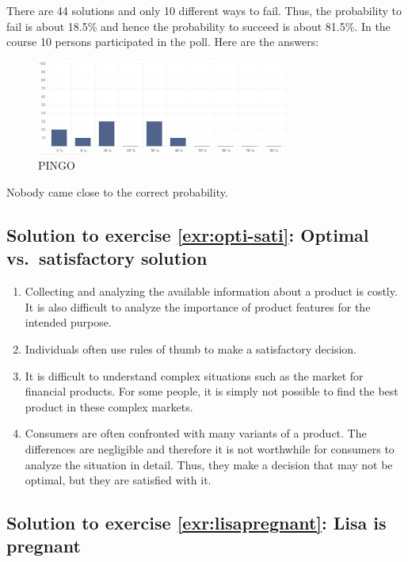 \documentclass[
  12pt,
  oneside]{book}
\providecommand{\tightlist}{%
  \setlength{\itemsep}{0pt}\setlength{\parskip}{0pt}}
\theoremstyle{definition}
\theoremstyle{definition}
\theoremstyle{definition}
\theoremstyle{definition}
\theoremstyle{remark}
\begin{document}
There are 44 solutions and only 10 different ways to fail. Thus, the probability to fail is about 18.5\% and hence the probability to succeed is about 81.5\%. In the course 10 persons participated in the poll. Here are the answers:

\begin{figure}
\centering
\includegraphics[width=0.75\textwidth,height=\textheight]{fig/nikolaus-poll.png}
\caption{\label{fig:nikolaus-poll} PINGO}
\end{figure}

Nobody came close to the correct probability.

\subsection*{Solution to exercise \ref{exr:opti-sati}: Optimal vs.~satisfactory solution}\label{sol:opti-sati}

\begin{enumerate}
\def\labelenumi{\Alph{enumi})}
\tightlist
\item
  Collecting and analyzing the available information about a product is costly. It is also difficult to analyze the importance of product features for the intended purpose.
\item
  Individuals often use rules of thumb to make a satisfactory decision.
\item
  It is difficult to understand complex situations such as the market for financial products. For some people, it is simply not possible to find the best product in these complex markets.
\item
  Consumers are often confronted with many variants of a product. The differences are negligible and therefore it is not worthwhile for consumers to analyze the situation in detail. Thus, they make a decision that may not be optimal, but they are satisfied with it.
\end{enumerate}

\subsection*{Solution to exercise \ref{exr:lisapregnant}: Lisa is pregnant}\label{sol:lisapregnant}
\end{document}
